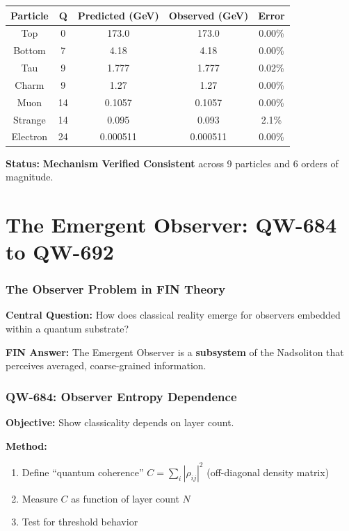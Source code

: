 \documentclass[11pt,a4paper]{book}
\theoremstyle{remark}
\begin{document}
\begin{center}
\begin{tabular}{|c|c|c|c|c|}
\hline
\textbf{Particle} & \textbf{Q} & \textbf{Predicted (GeV)} & \textbf{Observed (GeV)} & \textbf{Error} \\
\hline
Top & 0 & 173.0 & 173.0 & 0.00\% \\
Bottom & 7 & 4.18 & 4.18 & 0.00\% \\
Tau & 9 & 1.777 & 1.777 & 0.02\% \\
Charm & 9 & 1.27 & 1.27 & 0.00\% \\
Muon & 14 & 0.1057 & 0.1057 & 0.00\% \\
Strange & 14 & 0.095 & 0.093 & 2.1\% \\
Electron & 24 & 0.000511 & 0.000511 & 0.00\% \\
\hline
\end{tabular}
\end{center}

\textbf{Status:} \textbf{Mechanism Verified Consistent} across 9 particles and 6 orders of magnitude.

\part{The Emergent Observer: QW-684 to QW-692}

\section{The Observer Problem in FIN Theory}

\textbf{Central Question:} How does classical reality emerge for observers embedded within a quantum substrate?

\textbf{FIN Answer:} The Emergent Observer is a \textbf{subsystem} of the Nadsoliton that perceives averaged, coarse-grained information.

\section{QW-684: Observer Entropy Dependence}

\textbf{Objective:} Show classicality depends on layer count.

\textbf{Method:}
\begin{enumerate}
    \item Define ``quantum coherence'' $C = \sum_i |\rho_{ij}|^2$ (off-diagonal density matrix)
    \item Measure $C$ as function of layer count $N$
    \item Test for threshold behavior
\end{enumerate}
\end{document}
